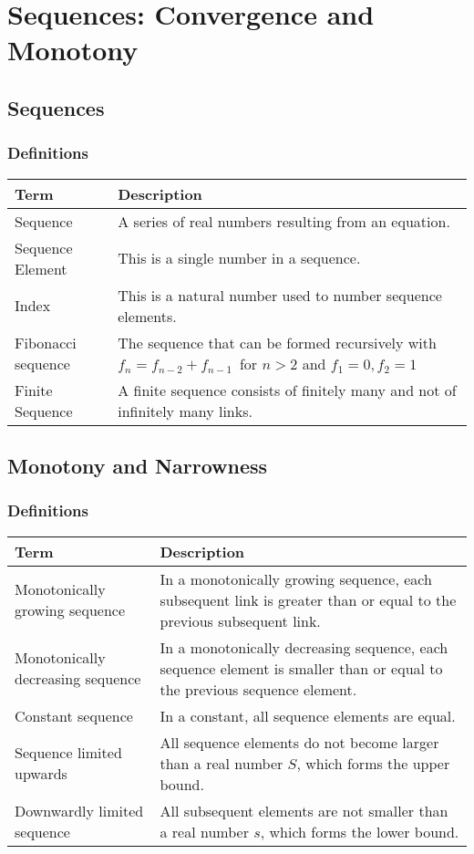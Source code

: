 \documentclass{book}
\begin{document}
\section{Sequences: Convergence and Monotony}
\subsection{Sequences}
\subsubsection{Definitions}
\begin{tabular}{p{3cm}p{10.5cm}}
  \toprule
  \textbf{Term} & \textbf{Description} \\
  \midrule
  Sequence    & A series of real numbers resulting from an equation.\\
  \midrule
  Sequence Element    & This is a single number in a sequence.\\
  \midrule
  Index       & This is a natural number used to number sequence elements.\\
  \midrule
  Fibonacci sequence & The sequence that can be formed recursively with $f_{n} = f_{n-2} + f_{n-1} \,$ for $n>2$ and $f_{1} = 0, f_{2} = 1$\\
  \midrule
  Finite Sequence & A finite sequence consists of finitely many and not of infinitely many links.\\
  \bottomrule
\end{tabular}


\subsection{Monotony and Narrowness}
\subsubsection{Definitions}
\begin{tabular}{p{3cm}p{10.5cm}}
  \toprule
  \textbf{Term} & \textbf{Description} \\
  \midrule
  Monotonically growing sequence & In a monotonically growing sequence, each subsequent link is greater than or equal to the previous subsequent link.\\
  \midrule
  Monotonically decreasing sequence & In a monotonically decreasing sequence, each sequence element is smaller than or equal to the previous sequence element.\\
  \midrule
  Constant sequence & In a constant, all sequence elements are equal.\\
  \midrule
  Sequence limited upwards & All sequence elements do not become larger than a real number $S$, which forms the upper bound.\\
  \midrule
  Downwardly limited sequence & All subsequent elements are not smaller than a real number $s$, which forms the lower bound.\\
  \bottomrule
\end{tabular}
\end{document}
